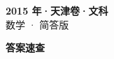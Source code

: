 \documentclass[zihao=-4, a4paper]{ctexart}
\begin{document}
\begin{center}
  {\Large\bfseries 2015 年·天津卷·文科}\\[4pt]
  {\large 数学 · 简答版}
\end{center}
\medskip
{}

\clearpage
{}
\begin{center}{\Large\bfseries 答案速查}\end{center}
\medskip

\end{document}
